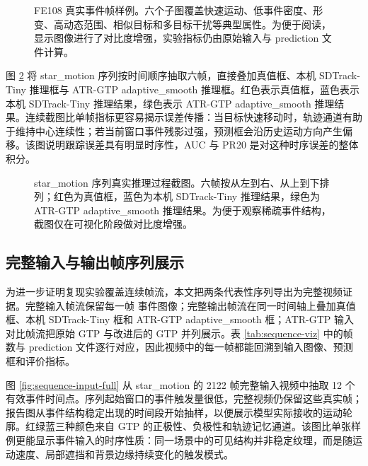 \documentclass[UTF8,a4paper,zihao=-4]{ctexart}
\newcommand{\code}[1]{\texttt{\detokenize{#1}}}
\begin{document}
\begin{figure}[H]
\centering
{}
\caption{FE108 真实事件帧样例。六个子图覆盖快速运动、低事件密度、形变、高动态范围、相似目标和多目标干扰等典型属性。为便于阅读，显示图像进行了对比度增强，实验指标仍由原始输入与 prediction 文件计算。}
\label{fig:dataset-real-samples}
\end{figure}

图 \ref{fig:tracking-process-real} 将 star\_motion 序列按时间顺序抽取六帧，直接叠加真值框、本机 SDTrack-Tiny 推理框与 ATR-GTP adaptive\_smooth 推理框。红色表示真值框，蓝色表示本机 SDTrack-Tiny 推理结果，绿色表示 ATR-GTP adaptive\_smooth 推理结果。连续截图比单帧指标更容易揭示误差传播：当目标快速移动时，轨迹通道有助于维持中心连续性；若当前窗口事件残影过强，预测框会沿历史运动方向产生偏移。该图说明跟踪误差具有明显时序性，AUC 与 PR20 是对这种时序误差的整体积分。

\begin{figure}[H]
\centering
{}
\caption{star\_motion 序列真实推理过程截图。六帧按从左到右、从上到下排列；红色为真值框，蓝色为本机 SDTrack-Tiny 推理结果，绿色为 ATR-GTP adaptive\_smooth 推理结果。为便于观察稀疏事件结构，截图仅在可视化阶段做对比度增强。}
\label{fig:tracking-process-real}
\end{figure}

\subsection{完整输入与输出帧序列展示}
为进一步证明复现实验覆盖连续帧流，本文把两条代表性序列导出为完整视频证据。完整输入帧流保留每一帧 \code{inter1\_stack\_3008} 事件图像；完整输出帧流在同一时间轴上叠加真值框、本机 SDTrack-Tiny 框和 ATR-GTP adaptive\_smooth 框；ATR-GTP 输入对比帧流把原始 GTP 与改进后的 GTP 并列展示。表 \ref{tab:sequence-viz} 中的帧数与 prediction 文件逐行对应，因此视频中的每一帧都能回溯到输入图像、预测框和评价指标。

\begin{table}[H]
\centering
\small
\caption{完整输入、输出与 ATR-GTP 输入对比帧流产物。}
\label{tab:sequence-viz}
\resizebox{\linewidth}{!}{}
\end{table}

图 \ref{fig:sequence-input-full} 从 star\_motion 的 2122 帧完整输入视频中抽取 12 个有效事件时间点。序列起始窗口的事件触发量很低，完整视频仍保留这些真实帧；报告图从事件结构稳定出现的时间段开始抽样，以便展示模型实际接收的运动轮廓。红绿蓝三种颜色来自 GTP 的正极性、负极性和轨迹记忆通道。该图比单张样例更能显示事件输入的时序性质：同一场景中的可见结构并非稳定纹理，而是随运动速度、局部遮挡和背景边缘持续变化的触发模式。
\end{document}
